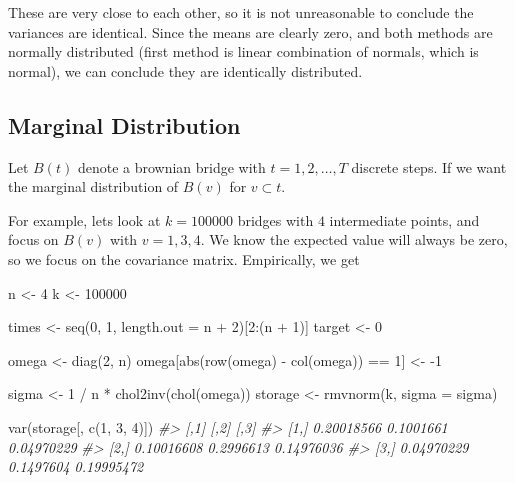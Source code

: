 \documentclass[
]{article}
\newenvironment{Shaded}{\begin{snugshade}}{\end{snugshade}}
\newcommand{\AttributeTok}[1]{\textcolor[rgb]{0.77,0.63,0.00}{#1}}
\newcommand{\CommentTok}[1]{\textcolor[rgb]{0.56,0.35,0.01}{\textit{#1}}}
\newcommand{\DecValTok}[1]{\textcolor[rgb]{0.00,0.00,0.81}{#1}}
\newcommand{\FunctionTok}[1]{\textcolor[rgb]{0.00,0.00,0.00}{#1}}
\newcommand{\NormalTok}[1]{#1}
\newcommand{\OtherTok}[1]{\textcolor[rgb]{0.56,0.35,0.01}{#1}}
\newcommand{\SpecialCharTok}[1]{\textcolor[rgb]{0.00,0.00,0.00}{#1}}
\begin{document}
These are very close to each other, so it is not unreasonable to conclude the variances are identical. Since the means are clearly zero, and both methods are normally distributed (first method is linear combination of normals, which is normal), we can conclude they are identically distributed.

\hypertarget{marginal-distribution}{%
\subsection{Marginal Distribution}\label{marginal-distribution}}

Let \(B(t)\) denote a brownian bridge with \(t = 1, 2, \dots, T\) discrete steps. If we want the marginal distribution of \(B(v)\) for \(v \subset t\).

For example, lets look at \(k = 100000\) bridges with \(4\) intermediate points, and focus on \(B(v)\) with \(v = 1, 3, 4\). We know the expected value will always be zero, so we focus on the covariance matrix. Empirically, we get

\begin{Shaded}
\begin{Highlighting}[]
\NormalTok{n }\OtherTok{\textless{}{-}} \DecValTok{4}
\NormalTok{k }\OtherTok{\textless{}{-}} \DecValTok{100000}

\NormalTok{times }\OtherTok{\textless{}{-}} \FunctionTok{seq}\NormalTok{(}\DecValTok{0}\NormalTok{, }\DecValTok{1}\NormalTok{, }\AttributeTok{length.out =}\NormalTok{ n }\SpecialCharTok{+} \DecValTok{2}\NormalTok{)[}\DecValTok{2}\SpecialCharTok{:}\NormalTok{(n }\SpecialCharTok{+} \DecValTok{1}\NormalTok{)]}
\NormalTok{target }\OtherTok{\textless{}{-}} \DecValTok{0}

\NormalTok{omega }\OtherTok{\textless{}{-}} \FunctionTok{diag}\NormalTok{(}\DecValTok{2}\NormalTok{, n)}
\NormalTok{omega[}\FunctionTok{abs}\NormalTok{(}\FunctionTok{row}\NormalTok{(omega) }\SpecialCharTok{{-}} \FunctionTok{col}\NormalTok{(omega)) }\SpecialCharTok{==} \DecValTok{1}\NormalTok{] }\OtherTok{\textless{}{-}} \SpecialCharTok{{-}}\DecValTok{1}

\NormalTok{sigma }\OtherTok{\textless{}{-}} \DecValTok{1} \SpecialCharTok{/}\NormalTok{ n }\SpecialCharTok{*} \FunctionTok{chol2inv}\NormalTok{(}\FunctionTok{chol}\NormalTok{(omega))}
\NormalTok{storage }\OtherTok{\textless{}{-}} \FunctionTok{rmvnorm}\NormalTok{(k, }\AttributeTok{sigma =}\NormalTok{ sigma)}

\FunctionTok{var}\NormalTok{(storage[, }\FunctionTok{c}\NormalTok{(}\DecValTok{1}\NormalTok{, }\DecValTok{3}\NormalTok{, }\DecValTok{4}\NormalTok{)])}
\CommentTok{\#\textgreater{}            [,1]      [,2]       [,3]}
\CommentTok{\#\textgreater{} [1,] 0.20018566 0.1001661 0.04970229}
\CommentTok{\#\textgreater{} [2,] 0.10016608 0.2996613 0.14976036}
\CommentTok{\#\textgreater{} [3,] 0.04970229 0.1497604 0.19995472}
\end{Highlighting}
\end{Shaded}
\end{document}
